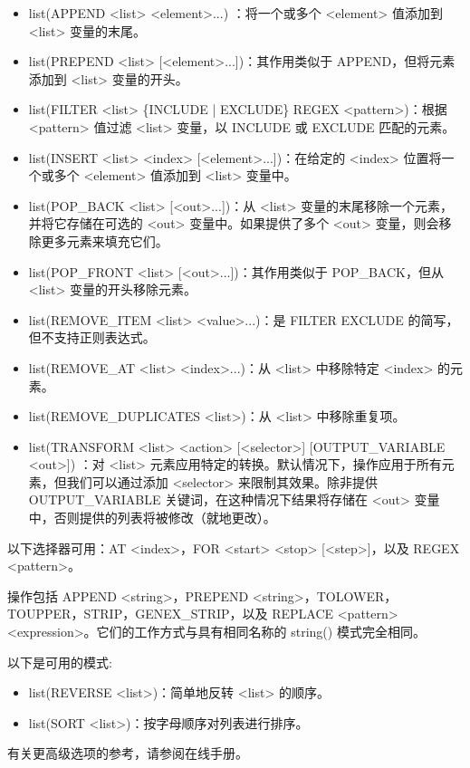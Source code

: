 \begin{itemize}
\item
list(APPEND <list> <element>...) ：将一个或多个 <element> 值添加到 <list> 变量的末尾。
\item
list(PREPEND <list> [<element>...])：其作用类似于 APPEND，但将元素添加到 <list> 变量的开头。

\item
list(FILTER <list> \{INCLUDE | EXCLUDE\} REGEX <pattern>)：根据 <pattern> 值过滤 <list> 变量，以 INCLUDE 或 EXCLUDE 匹配的元素。

\item
list(INSERT <list> <index> [<element>...])：在给定的 <index> 位置将一个或多个 <element> 值添加到 <list> 变量中。

\item
list(POP\_BACK <list> [<out>...])：从 <list> 变量的末尾移除一个元素，并将它存储在可选的 <out> 变量中。如果提供了多个 <out> 变量，则会移除更多元素来填充它们。

\item
list(POP\_FRONT <list> [<out>...])：其作用类似于 POP\_BACK，但从 <list> 变量的开头移除元素。

\item
list(REMOVE\_ITEM <list> <value>...)：是 FILTER EXCLUDE 的简写，但不支持正则表达式。

\item
list(REMOVE\_AT <list> <index>...)：从 <list> 中移除特定 <index> 的元素。

\item
list(REMOVE\_DUPLICATES <list>)：从 <list> 中移除重复项。

\item
list(TRANSFORM <list> <action> [<selector>] [OUTPUT\_VARIABLE <out>]) ：对 <list> 元素应用特定的转换。默认情况下，操作应用于所有元素，但我们可以通过添加 <selector> 来限制其效果。除非提供 OUTPUT\_VARIABLE 关键词，在这种情况下结果将存储在 <out> 变量中，否则提供的列表将被修改（就地更改）。
\end{itemize}

以下选择器可用：AT <index>，FOR <start> <stop> [<step>]，以及 REGEX <pattern>。

操作包括 APPEND <string>，PREPEND <string>，TOLOWER，TOUPPER，STRIP，GENEX\_STRIP，以及 REPLACE <pattern> <expression>。它们的工作方式与具有相同名称的 string() 模式完全相同。


以下是可用的模式:

\begin{itemize}
\item
list(REVERSE <list>)：简单地反转 <list> 的顺序。

\item
list(SORT <list>)：按字母顺序对列表进行排序。
\end{itemize}

有关更高级选项的参考，请参阅在线手册。











